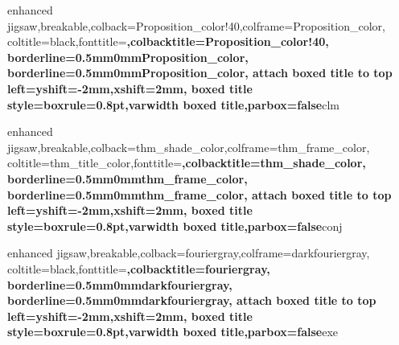{enhanced jigsaw,breakable,colback=Proposition_color!40,colframe=Proposition_color,
coltitle=black,fonttitle=\bfseries ,colbacktitle=Proposition_color!40,
borderline={0.5mm}{0mm}{Proposition_color},
borderline={0.5mm}{0mm}{Proposition_color},
attach boxed title to top left={yshift=-2mm,xshift=2mm},
boxed title style={boxrule=0.8pt},varwidth boxed title,parbox=false}{clm}


{enhanced jigsaw,breakable,colback=thm_shade_color,colframe=thm_frame_color,
coltitle=thm_title_color,fonttitle=\bfseries ,colbacktitle=thm_shade_color,
borderline={0.5mm}{0mm}{thm_frame_color},
borderline={0.5mm}{0mm}{thm_frame_color},
attach boxed title to top left={yshift=-2mm,xshift=2mm},
boxed title style={boxrule=0.8pt},varwidth boxed title,parbox=false}{conj}

{enhanced jigsaw,breakable,colback=fouriergray,colframe=darkfouriergray,
coltitle=black,fonttitle=\bfseries ,colbacktitle=fouriergray,
borderline={0.5mm}{0mm}{darkfouriergray},
borderline={0.5mm}{0mm}{darkfouriergray},
attach boxed title to top left={yshift=-2mm,xshift=2mm},
boxed title style={boxrule=0.8pt},varwidth boxed title,parbox=false}{exe}

\renewcommand*\proofname{Beweis}
\makeatletter
\newenvironment{beweis}[1][\proofname]{
	\par
	\pushQED{\qed}%
	\normalfont \topsep6\p@\@plus6\p@\relax
	\trivlist
	\item[\hskip\labelsep
		\bfseries #1\@addpunct{:}]~\newline\ignorespaces
}{
	\popQED\endtrivlist\@endpefalse
	\noindent\ignorespacesafterend
}
\newenvironment{pwoof}[1][\proofname]{
	\par
	\pushQED{\qed}%
	\normalfont \topsep6\p@\@plus6\p@\relax
	\trivlist
	\item[\hskip\labelsep
		\bfseries #1\@addpunct{:}]~\newline\ignorespaces
}{
	\popQED\endtrivlist\@endpefalse
	\noindent\ignorespacesafterend
}
\makeatother



\newsavebox{\informationbox}
\newenvironment{information}
{\begin{center}\begin{lrbox}{\informationbox}\begin{minipage}{0.8\textwidth}\small}
{\end{minipage}\end{lrbox}
\begin{tikzpicture}
\draw[fill] (-0.5*\wd\informationbox - 1cm, - 0.3cm) ellipse (0.3cm and 0.15cm);
\shadedraw[ball color=white] (-0.5*\wd\informationbox -  1cm, 0cm) circle (0.3cm);
\draw[color=black] (-0.5*\wd\informationbox - 1cm + 0.01cm, 0cm) node {\rotatebox{10}{\bfseries i}};

\draw (0,0) node {\usebox{\informationbox}};
\end{tikzpicture}\end{center}
}

